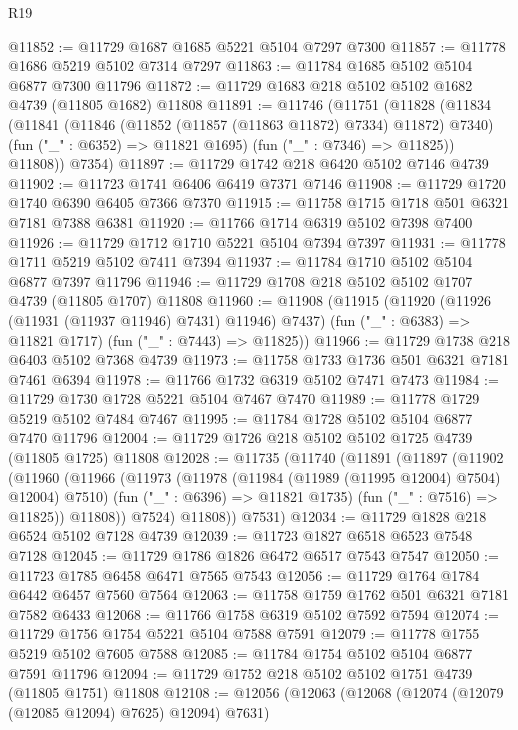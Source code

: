 \begin{lexlean}{R19}
\begin{coremodule}
{{{{{{{{{{{@11852 := @11729 @1687 @1685 @5221 @5104 @7297 @7300
@11857 := @11778 @1686 @5219 @5102 @7314 @7297
@11863 := @11784 @1685 @5102 @5104 @6877 @7300 @11796
@11872 := @11729 @1683 @218 @5102 @5102 @1682 @4739 (@11805 @1682) @11808
@11891 := @11746
    (@11751
      (@11828
        (@11834
          (@11841
            (@11846 (@11852 (@11857 (@11863 @11872) @7334) @11872) @7340)
            (fun ("_" : @6352) => @11821 @1695)
            (fun ("_" : @7346) => @11825))
          @11808))
      @7354)
@11897 := @11729 @1742 @218 @6420 @5102 @7146 @4739
@11902 := @11723 @1741 @6406 @6419 @7371 @7146
@11908 := @11729 @1720 @1740 @6390 @6405 @7366 @7370
@11915 := @11758 @1715 @1718 @501 @6321 @7181 @7388 @6381
@11920 := @11766 @1714 @6319 @5102 @7398 @7400
@11926 := @11729 @1712 @1710 @5221 @5104 @7394 @7397
@11931 := @11778 @1711 @5219 @5102 @7411 @7394
@11937 := @11784 @1710 @5102 @5104 @6877 @7397 @11796
@11946 := @11729 @1708 @218 @5102 @5102 @1707 @4739 (@11805 @1707) @11808
@11960 := @11908
    (@11915
      (@11920 (@11926 (@11931 (@11937 @11946) @7431) @11946) @7437)
      (fun ("_" : @6383) => @11821 @1717)
      (fun ("_" : @7443) => @11825))
@11966 := @11729 @1738 @218 @6403 @5102 @7368 @4739
@11973 := @11758 @1733 @1736 @501 @6321 @7181 @7461 @6394
@11978 := @11766 @1732 @6319 @5102 @7471 @7473
@11984 := @11729 @1730 @1728 @5221 @5104 @7467 @7470
@11989 := @11778 @1729 @5219 @5102 @7484 @7467
@11995 := @11784 @1728 @5102 @5104 @6877 @7470 @11796
@12004 := @11729 @1726 @218 @5102 @5102 @1725 @4739 (@11805 @1725) @11808
@12028 := @11735
    (@11740
      (@11891
        (@11897
          (@11902
            (@11960
              (@11966
                (@11973
                  (@11978 (@11984 (@11989 (@11995 @12004) @7504) @12004) @7510)
                  (fun ("_" : @6396) => @11821 @1735)
                  (fun ("_" : @7516) => @11825))
                @11808))
            @7524)
          @11808))
      @7531)
@12034 := @11729 @1828 @218 @6524 @5102 @7128 @4739
@12039 := @11723 @1827 @6518 @6523 @7548 @7128
@12045 := @11729 @1786 @1826 @6472 @6517 @7543 @7547
@12050 := @11723 @1785 @6458 @6471 @7565 @7543
@12056 := @11729 @1764 @1784 @6442 @6457 @7560 @7564
@12063 := @11758 @1759 @1762 @501 @6321 @7181 @7582 @6433
@12068 := @11766 @1758 @6319 @5102 @7592 @7594
@12074 := @11729 @1756 @1754 @5221 @5104 @7588 @7591
@12079 := @11778 @1755 @5219 @5102 @7605 @7588
@12085 := @11784 @1754 @5102 @5104 @6877 @7591 @11796
@12094 := @11729 @1752 @218 @5102 @5102 @1751 @4739 (@11805 @1751) @11808
@12108 := @12056
    (@12063
      (@12068 (@12074 (@12079 (@12085 @12094) @7625) @12094) @7631)
}}}}}}}}}}}
\end{coremodule}
\end{lexlean}
